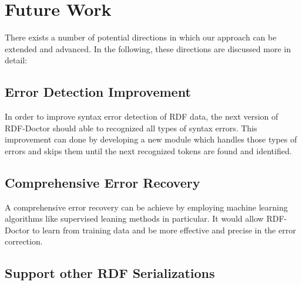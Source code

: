 \section{Future Work}

There exists a number of potential directions in which our approach can be extended and advanced. 
In the following, these directions are discussed more in detail:   

\subsection{Error Detection Improvement}
In order to improve syntax error detection of RDF data, the next version of RDF-Doctor should able to recognized all types of syntax errors. 
This improvement can done by
developing a new module which handles those types of errors and skips them until the next recognized tokens are found and identified. 

\subsection{Comprehensive Error Recovery}

A comprehensive error recovery can be achieve by employing  machine learning algorithms like supervised leaning methods in particular.
It would allow RDF-Doctor to learn from training data and be more effective and precise in the error correction.   

\subsection{Support other RDF Serializations }

